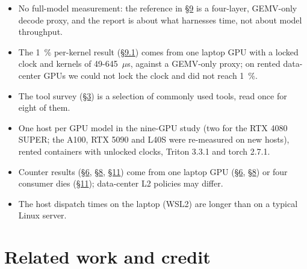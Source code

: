 \documentclass[11pt,a4paper]{article}
\providecommand{\tightlist}{\setlength{\itemsep}{0pt}\setlength{\parskip}{0pt}}
\begin{document}
\begin{itemize}
\tightlist
\item
  No full-model measurement: the reference in \hyperref[end-to-end-check-which-number-predicts-a-decode-step]{\S{}9} is a four-layer, GEMV-only decode proxy, and the report is about
  what harnesses time, not about model throughput.
\item
  The 1~\% per-kernel result (\hyperref[kernel-by-kernel-does-a-single-kernel-benchmark-match-the-same-kernel-inside-the-decode-proxy]{\S{}9.1}) comes from one laptop GPU with a locked clock and kernels of 49-645~\ensuremath{\mu}s, against a
  GEMV-only proxy; on rented data-center GPUs we could not lock the clock and did not reach 1~\%.
\item
  The tool survey (\hyperref[who-is-affected-a-survey-of-15-benchmarking-tools]{\S{}3}) is a selection of commonly used tools, read once for eight of them.
\item
  One host per GPU model in the nine-GPU study (two for the RTX 4080 SUPER; the A100, RTX 5090 and L40S were
  re-measured on new hosts), rented containers with unlocked clocks, Triton 3.3.1 and torch 2.7.1.
\item
  Counter results (\hyperref[what-removes-the-residue-and-what-does-not]{\S{}6}, \hyperref[pitfall-3-who-pays-for-a-kernels-own-writes]{\S{}8}, \hyperref[measurement-pitfall-per-kernel-dram-write-counters-lose-bytes]{\S{}11}) come from one laptop GPU (\hyperref[what-removes-the-residue-and-what-does-not]{\S{}6}, \hyperref[pitfall-3-who-pays-for-a-kernels-own-writes]{\S{}8}) or four consumer dies (\hyperref[measurement-pitfall-per-kernel-dram-write-counters-lose-bytes]{\S{}11}); data-center L2
  policies may differ.
\item
  The host dispatch times on the laptop (WSL2) are longer than on a typical Linux server.
\end{itemize}

\section{Related work and credit}\label{related-work-and-credit}
\end{document}
